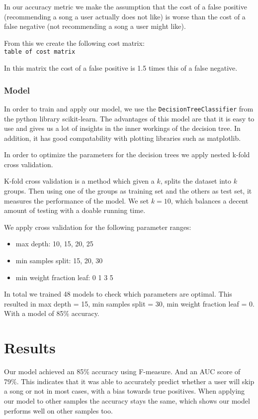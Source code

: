 \documentclass[conference]{IEEEtran}
\begin{document}
In our accuracy metric we make the assumption that the cost of a false positive (recommending a song a user actually does not like) is worse than the cost of a false negative (not recommending a song a user might like).

From this we create the following cost matrix: \\
\verb|table of cost matrix|

In this matrix the cost of a false positive is 1.5 times this of a false negative.


\subsubsection{Model}
In order to train and apply our model, we use the \verb|DecisionTreeClassifier| from 
the python library scikit-learn. The advantages of this model are that it is easy to use and gives us a lot of insights in the inner workings of the decision tree. 
In addition, it has good compatability with plotting libraries such as matplotlib.

In order to optimize the parameters for the decision trees we apply nested k-fold cross validation. 

K-fold cross validation is a method which given a $k$, splits the dataset into $k$ groups. 
Then using one of the groups as training set and the others as test set, it measures the performance of the model. 
We set $k = 10$, which balances a decent amount of testing with a doable running time.

We apply cross validation for the following parameter ranges: 
\begin{itemize}
	\item max depth: 10, 15, 20, 25 
	\item min samples split: 15, 20, 30
	\item min weight fraction leaf: 0 1 3 5
\end{itemize}
In total we trained 48 models to check which parameters are optimal. 
This resulted in max depth = 15, min samples split = 30, min weight fraction leaf = 0. With a model of 85\% accuracy.

\section{Results}
Our model achieved an 85\% accuracy using F-measure. 
And an AUC score of 79\%.
This indicates that it was able to accurately predict whether a user will skip a song or not in most cases, with a bias towards true positives.
When applying our model to other samples the accuracy stays the same, which shows our model performs well on other samples too.
\end{document}
